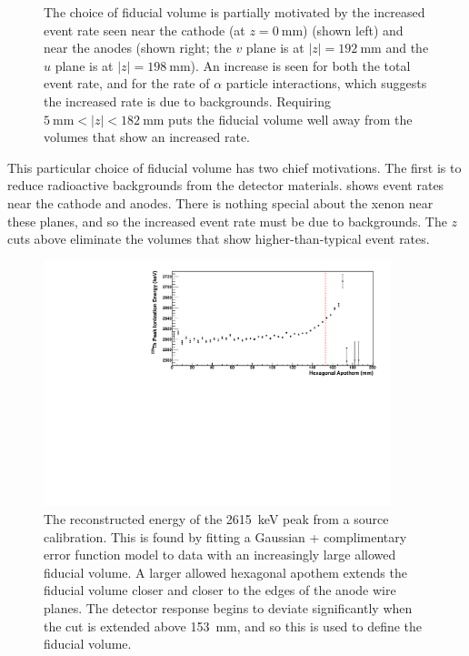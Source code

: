 \documentclass[herrin-thesis.tex]{subfiles}
\begin{document}
\begin{figure}[tbp]
\begin{subfigure}[b]{0.48\textwidth}
	\end{subfigure}
\caption[Increased event rates near cathode and anodes]{The choice of fiducial volume is partially motivated by the increased event rate seen near the cathode (at \(z = \SI{0}{\mm}\)) (shown left) and near the anodes (shown right; the \(v\) plane is at \(|z|=\SI{192}{\mm}\) and the \(u\) plane is at \(|z|=\SI{198}{\mm}\)). An increase is seen for both the total event rate, and for the rate of \(\alpha\) particle interactions, which suggests the increased rate is due to backgrounds. Requiring \(\SI{5}{\mm} < |z| < \SI{182}{\mm}\) puts the fiducial volume well away from the volumes that show an increased rate.}
\label{fig:analysis_fiducial_vol_bg_rates}
\end{figure}

This particular choice of fiducial volume has two chief motivations. The first is to reduce radioactive backgrounds from the detector materials.  shows event rates near the cathode and anodes. There is nothing special about the xenon near these planes, and so the increased event rate must be due to backgrounds. The \(z\) cuts above eliminate the volumes that show higher-than-typical event rates.

\begin{figure}[tbp]
\centering
\includegraphics[width=0.9\textwidth]{./plots/analysis_fiducial_vol_transverse.pdf}
\caption[Energy response due to increasing fiducial volume apothem]{The reconstructed energy of the \SI{2615}{\keV} peak from a  source calibration. This is found by fitting a Gaussian + complimentary error function model to data with an increasingly large allowed fiducial volume. A larger allowed hexagonal apothem extends the fiducial volume closer and closer to the edges of the anode wire planes. The detector response begins to deviate significantly when the cut is extended above \SI{153}{\mm}, and so this is used to define the fiducial volume.}
\label{fig:analysis_fiducial_vol_transverse}
\end{figure}
\end{document}
